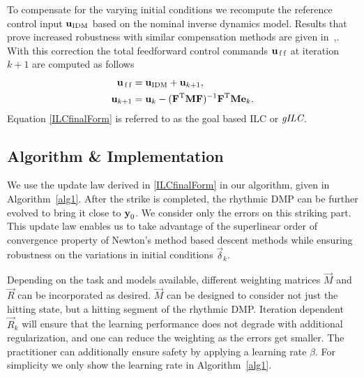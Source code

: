 To compensate for the varying initial conditions we recompute the reference control input $\boldsymbol{\mathrm{u}}_{\mathrm{IDM}}$ based on the nominal inverse dynamics model. Results that prove increased robustness with similar compensation methods are given in~\cite{Park00},\cite{Fang03}. With this correction the total feedforward control commands $\boldsymbol{\mathrm{u}}_{\mathrm{\,f\,f}}$ at iteration $k+1$ are computed as follows
%
\begin{equation}
\begin{aligned}
\boldsymbol{\mathrm{u}}_{\mathrm{\,f\,f}} &= \boldsymbol{\mathrm{u}}_{\mathrm{IDM}} + \boldsymbol{\mathrm{u}}_{k+1}, \\
\boldsymbol{\mathrm{u}}_{k+1} &= \boldsymbol{\mathrm{u}}_k - (\boldsymbol{\mathrm{F}}^{\mathrm{T}}\boldsymbol{\mathrm{M}}\boldsymbol{\mathrm{F}})^{-1}\boldsymbol{\mathrm{F}}^{\mathrm{T}}\boldsymbol{\mathrm{M}}\boldsymbol{\mathrm{e}}_k.\\
\end{aligned}
\label{ILCfinalForm}
\end{equation}
%
\noindent Equation \eqref{ILCfinalForm} is referred to as the goal based ILC or $\emph{gILC}$.


\subsection{Algorithm \& Implementation}\label{algorithm}

We use the update law derived in \eqref{ILCfinalForm} in our algorithm, given in Algorithm~\ref{alg1}. After the strike is completed, the rhythmic DMP can be further evolved to bring it close to $\boldsymbol{\mathrm{y}}_0$. We consider only the errors on this striking part. This update law enables us to take advantage of the superlinear order of convergence property of Newton's method based descent methods while ensuring robustness on the variations in initial conditions $\vec{\delta}_k$. 

Depending on the task and models available, different weighting matrices $\vec{M}$ and $\vec{R}$ can be incorporated as desired. $\vec{M}$ can be designed to consider not just the hitting state, but a hitting segment of the rhythmic DMP. Iteration dependent $\vec{R}_k$ will ensure that the learning performance does not degrade with additional regularization, and one can reduce the weighting as the errors get smaller. The practitioner can additionally ensure safety by applying a learning rate $\beta$. For simplicity we only show the learning rate in Algorithm~\ref{alg1}.%


